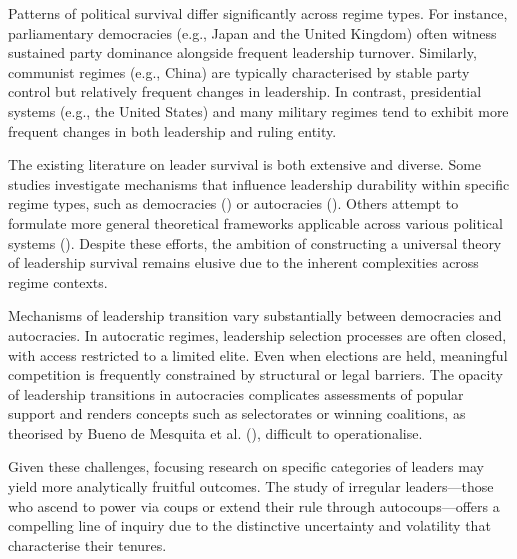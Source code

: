 \documentclass[
  12pt,
]{report}
\begin{document}
Patterns of political survival differ significantly across regime types.
For instance, parliamentary democracies (e.g., Japan and the United
Kingdom) often witness sustained party dominance alongside frequent
leadership turnover. Similarly, communist regimes (e.g., China) are
typically characterised by stable party control but relatively frequent
changes in leadership. In contrast, presidential systems (e.g., the
United States) and many military regimes tend to exhibit more frequent
changes in both leadership and ruling entity.

The existing literature on leader survival is both extensive and
diverse. Some studies investigate mechanisms that influence leadership
durability within specific regime types, such as democracies
() or autocracies
(). Others attempt to formulate more general theoretical frameworks
applicable across various political systems
().
Despite these efforts, the ambition of constructing a universal theory
of leadership survival remains elusive due to the inherent complexities
across regime contexts.

Mechanisms of leadership transition vary substantially between
democracies and autocracies. In autocratic regimes, leadership selection
processes are often closed, with access restricted to a limited elite.
Even when elections are held, meaningful competition is frequently
constrained by structural or legal barriers. The opacity of leadership
transitions in autocracies complicates assessments of popular support
and renders concepts such as selectorates or winning coalitions, as
theorised by Bueno de Mesquita et al.
(), difficult to operationalise.

Given these challenges, focusing research on specific categories of
leaders may yield more analytically fruitful outcomes. The study of
irregular leaders---those who ascend to power via coups or extend their
rule through autocoups---offers a compelling line of inquiry due to the
distinctive uncertainty and volatility that characterise their tenures.
\end{document}
